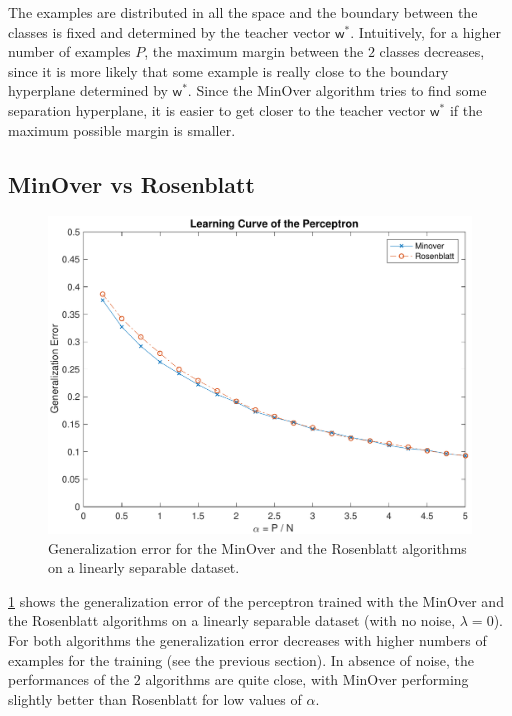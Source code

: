The examples are distributed in all the space and the boundary between the classes is fixed and determined by the teacher vector $\bm{\mathsf{w}}^{*}$.
Intuitively, for a higher number of examples $P$, the maximum margin between the $2$ classes decreases, since it is more likely that some example is really close to the boundary hyperplane determined by $\bm{\mathsf{w}}^{*}$.
Since the MinOver algorithm tries to find some separation hyperplane, it is easier to get closer to the teacher vector $\bm{\mathsf{w}}^{*}$ if the maximum possible margin is smaller.


\subsection{MinOver vs Rosenblatt}
\begin{figure}[t]
	\centering
	\includegraphics[width=\columnwidth]{figures/comparison}
    \caption{Generalization error for the MinOver and the Rosenblatt algorithms on a linearly separable dataset.}
	\label{fig:comparison}
\end{figure}

\cref{fig:comparison} shows the generalization error of the perceptron trained with the MinOver and the Rosenblatt algorithms on a linearly separable dataset (with no noise, $\lambda = 0$).
For both algorithms the generalization error decreases with higher numbers of examples for the training (see the previous section).
In absence of noise, the performances of the $2$ algorithms are quite close, with MinOver performing slightly better than Rosenblatt for low values of $\alpha$.


